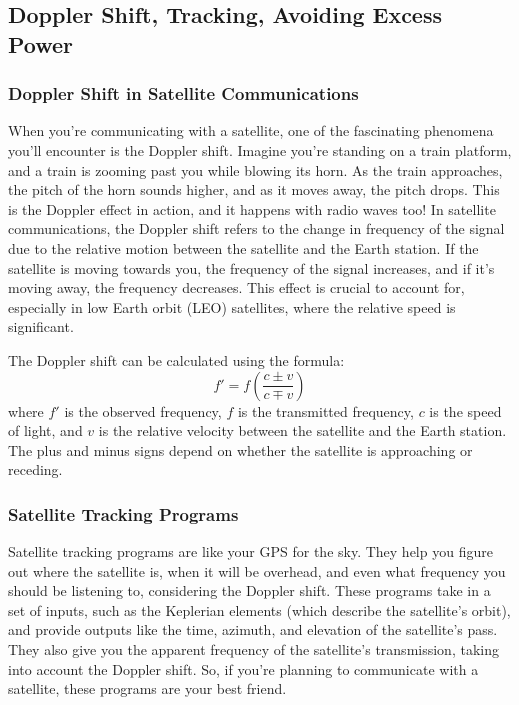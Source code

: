 \subsection{Doppler Shift, Tracking, Avoiding Excess Power}
\label{subsec:sat-tracking}

\subsubsection*{Doppler Shift in Satellite Communications}
When you're communicating with a satellite, one of the fascinating phenomena you'll encounter is the Doppler shift. Imagine you're standing on a train platform, and a train is zooming past you while blowing its horn. As the train approaches, the pitch of the horn sounds higher, and as it moves away, the pitch drops. This is the Doppler effect in action, and it happens with radio waves too! In satellite communications, the Doppler shift refers to the change in frequency of the signal due to the relative motion between the satellite and the Earth station. If the satellite is moving towards you, the frequency of the signal increases, and if it's moving away, the frequency decreases. This effect is crucial to account for, especially in low Earth orbit (LEO) satellites, where the relative speed is significant.

The Doppler shift can be calculated using the formula:
\begin{equation}
    f' = f \left( \frac{c \pm v}{c \mp v} \right)
\end{equation}
where \( f' \) is the observed frequency, \( f \) is the transmitted frequency, \( c \) is the speed of light, and \( v \) is the relative velocity between the satellite and the Earth station. The plus and minus signs depend on whether the satellite is approaching or receding.

\subsubsection*{Satellite Tracking Programs}
Satellite tracking programs are like your GPS for the sky. They help you figure out where the satellite is, when it will be overhead, and even what frequency you should be listening to, considering the Doppler shift. These programs take in a set of inputs, such as the Keplerian elements (which describe the satellite's orbit), and provide outputs like the time, azimuth, and elevation of the satellite's pass. They also give you the apparent frequency of the satellite's transmission, taking into account the Doppler shift. So, if you're planning to communicate with a satellite, these programs are your best friend.

